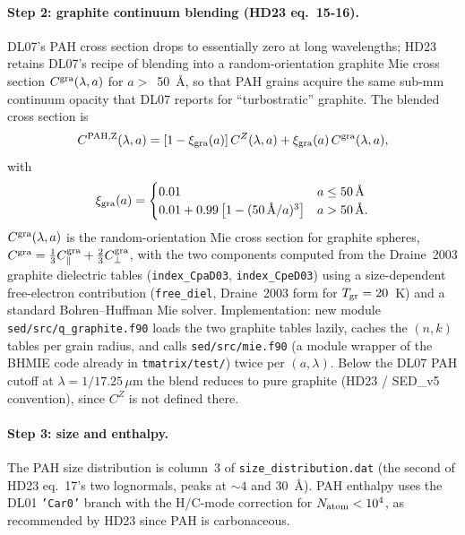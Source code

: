 \documentclass{my_memo}
\begin{document}
\paragraph{Step 2: graphite continuum blending (HD23 eq.~15-16).}
DL07's PAH cross section drops to essentially zero at long
wavelengths; HD23 retains DL07's recipe of blending into a
random-orientation graphite Mie cross section $C^{\rm gra}(\lambda, a)$
for $a > $~\SI{50}{\angstrom}, so that PAH grains acquire the same
sub-mm continuum opacity that DL07 reports for ``turbostratic''
graphite. The blended cross section is
\begin{equation}
C^{\rm PAH, Z}(\lambda, a) = [1 - \xi_{\rm gra}(a)]\,C^Z(\lambda, a)
                           + \xi_{\rm gra}(a)\,C^{\rm gra}(\lambda, a),
\label{eq:xi_gra}
\end{equation}
with
\begin{equation}
\xi_{\rm gra}(a) = \begin{cases}
   0.01 & a \le \SI{50}{\angstrom} \\
   0.01 + 0.99\,\bigl[1 - (\SI{50}{\angstrom}/a)^3\bigr]
        & a > \SI{50}{\angstrom}.
\end{cases}
\end{equation}
$C^{\rm gra}(\lambda, a)$ is the random-orientation Mie cross section
for graphite spheres,
$C^{\rm gra} = \tfrac{1}{3}C^{\rm gra}_\parallel
            + \tfrac{2}{3}C^{\rm gra}_\perp$, with the two components
computed from the Draine~2003 graphite dielectric tables
(\texttt{index\_CpaD03}, \texttt{index\_CpeD03}) using a
size-dependent free-electron contribution
(\texttt{free\_diel}, Draine~2003 form for $T_{\rm gr} = 20$~K) and a
standard Bohren--Huffman Mie solver. Implementation: new module
\texttt{sed/src/q\_graphite.f90} loads the two graphite tables lazily,
caches the $(n, k)$ tables per grain radius, and calls
\texttt{sed/src/mie.f90} (a module wrapper of the BHMIE code already
in \texttt{tmatrix/test/}) twice per $(a, \lambda)$. Below the DL07
PAH cutoff at $\lambda = 1/17.25$\,$\mu$m the blend reduces to pure
graphite (HD23 / SED\_v5 convention), since $C^Z$ is not defined
there.

\paragraph{Step 3: size and enthalpy.} The PAH size distribution is
column~3 of \texttt{size\_distribution.dat} (the second of HD23
eq.~17's two lognormals, peaks at $\sim 4$ and \SI{30}{\angstrom}).
PAH enthalpy uses the DL01 \texttt{'Car0'} branch with the H/C-mode
correction for $N_{\rm atom} < 10^4$, as recommended by HD23 since PAH
is carbonaceous.
\end{document}
